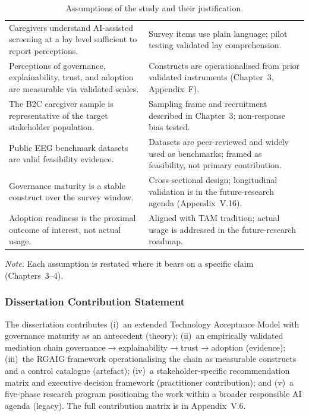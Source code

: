{\tablestripes\tablefontsize
{}
\begin{xltabular}{\textwidth}{@{} >{\raggedright\arraybackslash}p{5cm} L @{}}
\caption[Assumptions of the study and their justification]{Assumptions of the study and their justification.}\label{tab:ch1_assumptions} \\
\toprule
{} &  \\
\midrule
\endfirsthead
\endhead
\bottomrule
\endlastfoot
Caregivers understand AI-assisted screening at a lay level sufficient to report perceptions. & Survey items use plain language; pilot testing validated lay comprehension. \\
\addlinespace
Perceptions of governance, explainability, trust, and adoption are measurable via validated scales. & Constructs are operationalised from prior validated instruments (Chapter~3, Appendix~F). \\
\addlinespace
The B2C caregiver sample is representative of the target stakeholder population. & Sampling frame and recruitment described in Chapter~3; non-response bias tested. \\
\addlinespace
Public EEG benchmark datasets are valid feasibility evidence. & Datasets are peer-reviewed and widely used as benchmarks; framed as feasibility, not primary contribution. \\
\addlinespace
Governance maturity is a stable construct over the survey window. & Cross-sectional design; longitudinal validation is in the future-research agenda (Appendix~V.16). \\
\addlinespace
Adoption readiness is the proximal outcome of interest, not actual usage. & Aligned with TAM tradition; actual usage is addressed in the future-research roadmap. \\
\end{xltabular}}

\vspace{0.3em}\noindent\textit{Note.} Each assumption is restated where it bears on a specific claim (Chapters~3--4).


\subsubsection{Dissertation Contribution Statement}
\label{sec:ch1_contribution_statement}

\noindent The dissertation contributes (i)~an extended Technology Acceptance Model with governance maturity as an antecedent (theory); (ii)~an empirically validated mediation chain governance$\rightarrow$explainability$\rightarrow$trust$\rightarrow$adoption (evidence); (iii)~the RGAIG framework operationalising the chain as measurable constructs and a control catalogue (artefact); (iv)~a stakeholder-specific recommendation matrix and executive decision framework (practitioner contribution); and (v)~a five-phase research program positioning the work within a broader responsible AI agenda (legacy). The full contribution matrix is in Appendix~V.6.


